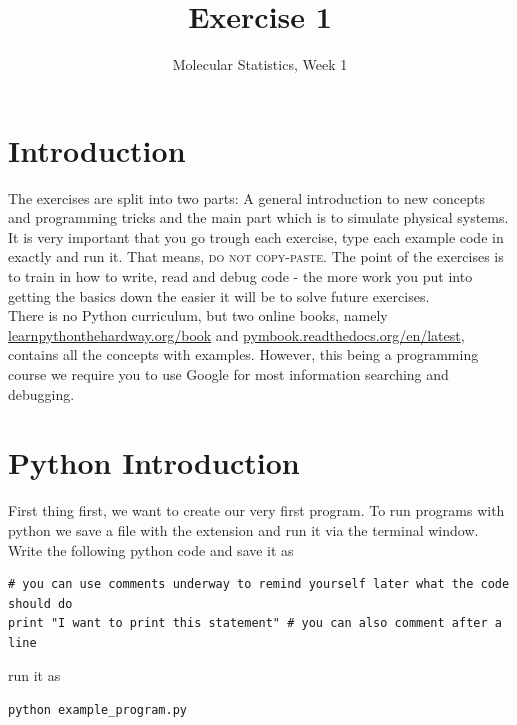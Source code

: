 \documentclass{article}
\title{Exercise 1}
\author{Molecular Statistics, Week 1}
\date{}
\begin{document}

\maketitle

\section*{Introduction}

The exercises are split into two parts: A general introduction to new concepts and programming tricks and the main part which is to simulate physical systems.
It is very important that you go trough each exercise, type each example code in exactly and run it.
That means, \textsc{do not copy-paste}.
The point of the exercises is to train in how to write, read and debug code - the more work you put into getting the basics down the easier it will be to solve future exercises.\\


There is no Python curriculum, but two online books, namely
\href{http://learnpythonthehardway.org/book/}{learnpythonthehardway.org/book} and
\href{http://pymbook.readthedocs.org/en/latest/}{pymbook.readthedocs.org/en/latest},
contains all the concepts with examples.
However, this being a programming course we require you to use Google for most information searching and debugging.

\section{Python Introduction}

First thing first, we want to create our very first program.
To run programs with python we save a file with the extension  and run it via the terminal window.
Write the following python code and save it as 

\begin{lstlisting}
# you can use comments underway to remind yourself later what the code should do
print "I want to print this statement" # you can also comment after a line
\end{lstlisting}

run it as

\begin{lstlisting}
python example_program.py
\end{lstlisting}
\end{document}
